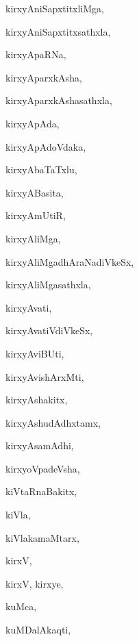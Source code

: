 \begin{multicols}{3}
{\noindent
{kirxyAniSapxtitxliMga}, \pageref{kirxyAniSapxtitxliMga}

\noindent
{kirxyAniSapxtitxsathxla}, \pageref{kirxyAniSapxtitxsathxla}

\noindent
{kirxyApaRNa}, \pageref{kirxyApaRNa}

\noindent
{kirxyAparxkAsha}, \pageref{kirxyAparxkAsha}

\noindent
{kirxyAparxkAshasathxla}, \pageref{kirxyAparxkAshasathxla}

\noindent
{kirxyApAda}, \pageref{kirxyApAda}

\noindent
{kirxyApAdoVdaka}, \pageref{kirxyApAdoVdaka}

\noindent
{kirxyAbaTaTxlu}, \pageref{kirxyAbaTaTxlu}

\noindent
{kirxyABasita}, \pageref{kirxyABasita}

\noindent
{kirxyAmUtiR}, \pageref{kirxyAmUtiR}

\noindent
{kirxyAliMga}, \pageref{kirxyAliMga}

\noindent
{kirxyAliMgadhAraNadiVkeSx}, \pageref{kirxyAliMgadhAraNadiVkeSx}

\noindent
{kirxyAliMgasathxla}, \pageref{kirxyAliMgasathxla}

\noindent
{kirxyAvati}, \pageref{kirxyAvati}

\noindent
{kirxyAvatiVdiVkeSx}, \pageref{kirxyAvatiVdiVkeSx}

\noindent
{kirxyAviBUti}, \pageref{kirxyAviBUti}

\noindent
{kirxyAvishArxMti}, \pageref{kirxyAvishArxMti}

\noindent
{kirxyAshakitx}, \pageref{kirxyAshakitx}

\noindent
{kirxyAshudAdhxtamx}, \pageref{kirxyAshudAdhxtamx}

\noindent
{kirxyAsamAdhi}, \pageref{kirxyAsamAdhi}

\noindent
{kirxyoVpadeVsha}, \pageref{kirxyoVpadeVsha}

\noindent
{kiVtaRnaBakitx}, \pageref{kiVtaRnaBakitx}

\noindent
{kiVla}, \pageref{kiVla}

\noindent
{kiVlakamaMtarx}, \pageref{kiVlakamaMtarx}

\noindent
{kirxV}, \pageref{kirxV}

\noindent
{kirxV, kirxye}, \pageref{kirxV, kirxye}

\noindent
{kuMca}, \pageref{kuMca}

\noindent
{kuMDalAkaqti}, \pageref{kuMDalAkaqti}

}
\end{multicols}
